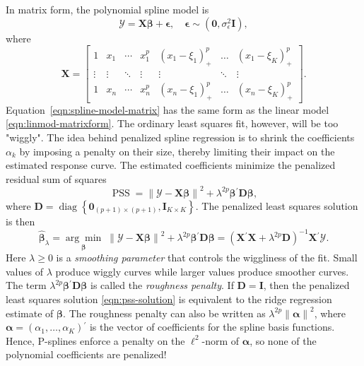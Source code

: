\documentclass[cmfont,usenames,dvipsnames,leqno]{afit-etd}\usepackage[]{graphicx}\usepackage[]{color}
\newcommand{\norm}[1]{\left\|#1\right\|}
\newcommand{\trans}{\ensuremath{^\prime}}
\newcommand{\bc}[1]{\ensuremath{\bm{\mathcal{#1}}}}
\newcommand{\wh}[1]{\ensuremath{\widehat{#1}}}
\newcommand{\argmin}[1]{\underset{#1}{\operatorname{arg}\!\operatorname{min}}\;}
\newcommand{\diag}{\operatorname{diag}}
\newcommand{\PSS}{\operatorname{PSS}}
\newcommand{\X}{\ensuremath{\bm{X}}}
\begin{document}
In matrix form, the polynomial spline model is
\begin{equation}
\label{eqn:spline-model-matrix}
  \bc{Y} = \X\bm{\beta} + \bm{\epsilon}, \quad \bm{\epsilon} \sim (\bm{0}, \sigma_\epsilon^2\bm{I}),
\end{equation}
where 
\begin{equation*}
  \X = 
    \begin{bmatrix}
      1 & x_1 & \cdots & x_1^p & (x_1-\xi_1)_+^p & \dotsc & (x_1-\xi_K)_+^p \\  
      \vdots & \vdots & \ddots & \vdots & \vdots & \ddots & \vdots \\
      1 & x_n & \cdots & x_n^p & (x_n-\xi_1)_+^p & \dotsc & (x_n-\xi_K)_+^p
    \end{bmatrix}.              
\end{equation*}
Equation~\eqref{eqn:spline-model-matrix} has the same form as the linear model \eqref{eqn:linmod-matrixform}. The ordinary least squares fit, however, will be too "wiggly". The idea behind penalized spline regression is to shrink the coefficients $\alpha_k$ by imposing a penalty on their size, thereby limiting their impact on the estimated response curve. The estimated coefficients minimize the penalized residual sum of squares
\begin{equation}
\label{eqn:pss}
  \PSS = \norm{\bc{Y} - \X\bm{\beta}}^2 + \lambda^{2p}\bm{\beta}\trans\bm{D}\bm{\beta},
\end{equation}
where $\bm{D} = \diag\left\{\bm{0}_{(p+1) \times (p+1)}, \bm{I}_{K \times K}\right\}$. The penalized least squares solution is then
\begin{equation}
\label{eqn:pss-solution}
  \wh{\bm{\beta}}_\lambda = \argmin{\bm{\beta}} \norm{\bc{Y} - \X\bm{\beta}}^2 + \lambda^{2p}\bm{\beta}\trans\bm{D}\bm{\beta} = \left( \X\trans\X + \lambda^{2p}\bm{D} \right)^{-1}\X\trans\bc{Y}.
\end{equation}
Here $\lambda \ge 0$ is a \textit{smoothing parameter} that controls the wiggliness of the fit. Small values of $\lambda$ produce wiggly curves while larger values  produce smoother curves. The term $\lambda^{2p}\bm{\beta}\trans\bm{D}\bm{\beta}$ is called the \textit{roughness penalty}. If $\bm{D} = \bm{I}$, then the penalized least squares solution \eqref{eqn:pss-solution} is equivalent to the ridge regression estimate of $\bm{\beta}$. The roughness penalty can also be written as $\lambda^{2p}\norm{\bm{\alpha}}^2$, where $\bm{\alpha} = (\alpha_1, \dotsc, \alpha_K)\trans$ is the vector of coefficients for the spline basis functions. Hence, \acp{P-spline} enforce a penalty on the $\ell^2$-norm of $\bm{\alpha}$, so none of the polynomial coefficients are penalized! 
\end{document}
